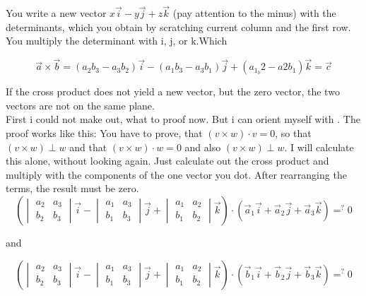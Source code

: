 \documentclass[a4paper]{article}
\begin{document}
\begin{Example}
You write a new vector $x\vec{i}-y\vec{j}+z\vec{k}$ (pay attention to the minus) with the determinants, which you obtain by scratching current column and the first row. You multiply the determinant with i, j, or k.Which

\begin{displaymath}
    \vec{a} \times \vec{b} = (a_{2}b_{3}-a_{3}b_{2})\vec{i} - (a_{1}b_{3}-a_{3}b_{1})\vec{j} + (a_{1}_b{2}-a{2}b_{1})\vec{k} = \vec{c}
\end{displaymath}

If the cross product does not yield a new vector, but the  zero vector, the two vectors are not on the same plane.\\

First i could not make out, what to proof now. But i can orient myself with \cite{Corral1}. The proof works like this: You have to prove, that $(v \times w) \cdot v = 0$, so that $(v \times w) \perp w$ and that $(v \times w) \cdot w = 0$ and also $(v \times w) \perp w$. I will calculate this alone, without looking again. Just calculate out the cross product and multiply with the components of the one vector you dot. After rearranging the terms, the result must be zero.\\

\begin{displaymath}
\left(\begin{vmatrix}
a_2 & a_3 \\
b_2 & b_3 
\end{vmatrix} \vec{i} - \begin{vmatrix}a_1 & a_3\\ b_1 & b_3\end{vmatrix} \vec{j} + \begin{vmatrix}a_1 & a_2\\b_1 & b_2\end{vmatrix} \vec{k}\right) \cdot \left(\vec{a}_{1}\vec{i} + \vec{a}_{2}\vec{j} + \vec{a}_{3}\vec{k}\right) =\nolimits^{?} 0
\end{displaymath}

and

\begin{displaymath}
\left(\begin{vmatrix}
a_2 & a_3 \\
b_2 & b_3 
\end{vmatrix} \vec{i} - \begin{vmatrix}a_1 & a_3\\ b_1 & b_3\end{vmatrix} \vec{j} + \begin{vmatrix}a_1 & a_2\\b_1 & b_2\end{vmatrix} \vec{k}\right) \cdot \left(\vec{b}_{1}\vec{i} + \vec{b}_{2}\vec{j} + \vec{b}_{3}\vec{k}\right) =\nolimits^{?} 0
\end{displaymath}




\end{Example}
\end{document}

